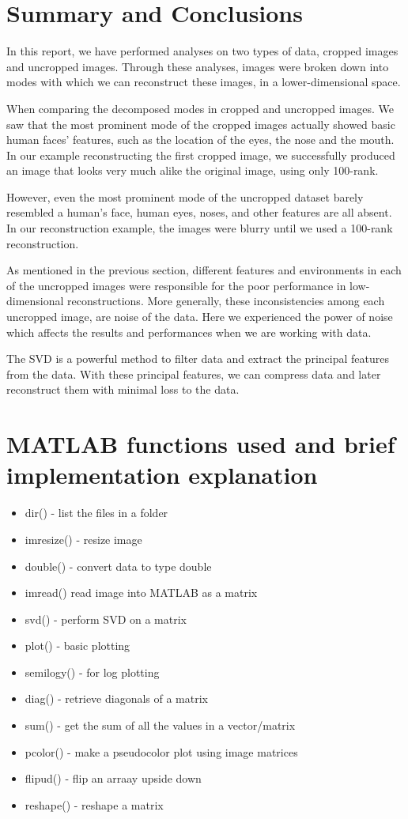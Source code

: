 \documentclass[12pt,a4paper]{article}
\begin{document}
\section{Summary and Conclusions}
In this report, we have performed analyses on two types of data, cropped images and uncropped images. Through these analyses, images were broken down into modes with which we can reconstruct these images, in a lower-dimensional space. 

When comparing the decomposed modes in cropped and uncropped images. We saw that the most prominent mode of the cropped images actually showed basic human faces' features, such as the location of the eyes, the nose and the mouth. In our example reconstructing the first cropped image, we successfully produced an image that looks very much alike the original image, using only 100-rank. 

However, even the most prominent mode of the uncropped dataset barely resembled a human's face, human eyes, noses, and other features are all absent. In our reconstruction example, the images were blurry until we used a 100-rank reconstruction. 

As mentioned in the previous section, different features and environments in each of the uncropped images were responsible for the poor performance in low-dimensional reconstructions. More generally, these inconsistencies among each uncropped image, are noise of the data. Here we experienced the power of noise which affects the results and performances when we are working with data.

The SVD is a powerful method to filter data and extract the principal features from the data. With these principal features, we can compress data and later reconstruct them with minimal loss to the data.

\appendix
\section{MATLAB functions used and brief implementation explanation}
\begin{itemize}
	\item dir() - list the files in a folder
	\item imresize() - resize image
	\item double() - convert data to type double
	\item imread() read image into MATLAB as a matrix
	\item svd() - perform SVD on a matrix
	\item plot() - basic plotting
	\item semilogy() - for log plotting
	\item diag() - retrieve diagonals of a matrix
	\item sum() - get the sum of all the values in a vector/matrix
	\item pcolor() - make a pseudocolor plot using image matrices
	\item flipud() - flip an arraay upside down
	\item reshape() - reshape a matrix
\end{itemize}
\end{document}
